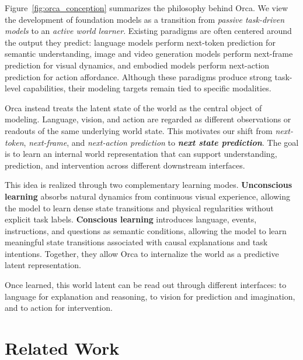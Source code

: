 \documentclass{llmxive}
\providecommand{\currentnavsection}{sec:intro}
\providecommand{\setnavsection}[1]{  \gdef\currentnavsection{#1}}
\providecommand{\thefigure}{A\arabic{figure}}
\providecommand{\theHfigure}{A\arabic{figure}}
\begin{document}
Figure~\ref{fig:orca_conception} summarizes the philosophy behind Orca. We view the development of foundation models as a transition from \textit{passive task-driven models} to an \textit{active world learner}. Existing paradigms are often centered around the output they predict: language models perform next-token prediction for semantic understanding, image and video generation models perform next-frame prediction for visual dynamics, and embodied models perform next-action prediction for action affordance. Although these paradigms produce strong task-level capabilities, their modeling targets remain tied to specific modalities.

Orca instead treats the latent state of the world as the central object of modeling. Language, vision, and action are regarded as different observations or readouts of the same underlying world state. This motivates our shift from \textit{next-token}, \textit{next-frame}, and \textit{next-action prediction} to \textbf{\textit{next state prediction}}. The goal is to learn an internal world representation that can support understanding, prediction, and intervention across different downstream interfaces.

This idea is realized through two complementary learning modes. \textbf{Unconscious learning} absorbs natural dynamics from continuous visual experience, allowing the model to learn dense state transitions and physical regularities without explicit task labels. \textbf{Conscious learning} introduces language, events, instructions, and questions as semantic conditions, allowing the model to learn meaningful state transitions associated with causal explanations and task intentions. Together, they allow Orca to internalize the world as a predictive latent representation.

Once learned, this world latent can be read out through different interfaces: to language for explanation and reasoning, to vision for prediction and imagination, and to action for intervention.


\section{Related Work}\label{sec:appendix_related_work}
\setnavsection{sec:appendix_related_work}

\renewcommand{\thefigure}{B\arabic{figure}}
\renewcommand{\theHfigure}{B\arabic{figure}}
\setcounter{figure}{0}
\end{document}
